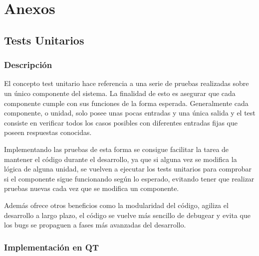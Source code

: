 
\pagestyle{fancy}
\fancyhead[LE,RO]{\thepage}
\fancyhead[LO]{\nouppercase{\rightmark}}

\chapter{Anexos}

\minitoc

\section{Tests Unitarios}

\subsection{Descripción}

El concepto test unitario hace referencia a una serie de pruebas realizadas sobre un único componente del sistema. La finalidad de esto es asegurar que cada componente cumple con sus funciones de la forma esperada. Generalmente cada componente, o unidad, solo posee unas pocas entradas y una única salida y el test consiste en verificar todos los casos posibles con diferentes entradas fijas que poseen respuestas conocidas.

Implementando las pruebas de esta forma se consigue facilitar la tarea de mantener el código durante el desarrollo, ya que si alguna vez se modifica la lógica de alguna unidad, se vuelven a ejecutar los tests unitarios para comprobar si el componente sigue funcionando según lo esperado, evitando tener que realizar pruebas nuevas cada vez que se modifica un componente.

Además ofrece otros beneficios como la modularidad del código, agiliza el desarrollo a largo plazo, el código se vuelve más sencillo de debugear y evita que los bugs se propaguen a fases más avanzadas del desarrollo.

\subsection{Implementación en QT}

